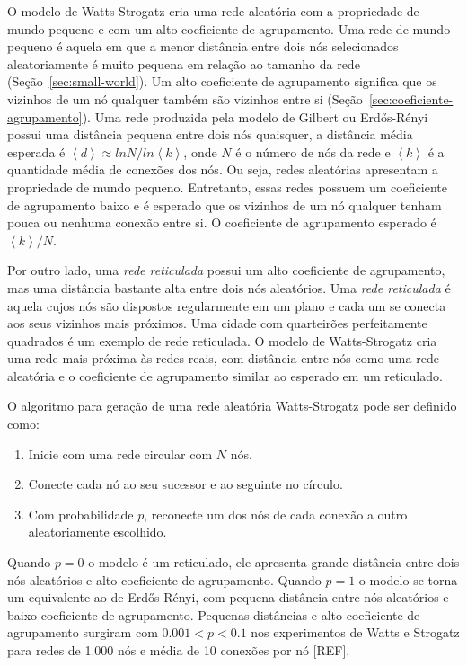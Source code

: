 \documentclass[12pt,a4paper]{article}
\theoremstyle{hypo}
\newcommand{\avg}[1]{\left\langle #1 \right\rangle} %
\begin{document}
O modelo de Watts-Strogatz cria uma rede aleatória com a propriedade de mundo pequeno e com um alto coeficiente de agrupamento. Uma rede de mundo pequeno é aquela em que a menor distância entre dois nós selecionados aleatoriamente é muito pequena em relação ao tamanho da rede (Seção~\ref{sec:small-world}). Um alto coeficiente de agrupamento significa que os vizinhos de um nó qualquer também são vizinhos entre si (Seção~\ref{sec:coeficiente-agrupamento}).
Uma rede produzida pela modelo de Gilbert ou Erdős-Rényi possui uma distância pequena entre dois nós quaisquer, a distância média esperada é $\avg{d} \approx ln N / ln \avg{k}$, onde $N$ é o número de nós da rede e $\avg{k}$ é a quantidade média de conexões dos nós. Ou seja, redes aleatórias apresentam a propriedade de mundo pequeno. Entretanto, essas redes possuem um coeficiente de agrupamento baixo e é esperado que os vizinhos de um nó qualquer tenham pouca ou nenhuma conexão entre si. O coeficiente de agrupamento esperado é $\avg{k}/N$.



Por outro lado, uma \textit{rede reticulada} possui um alto coeficiente de agrupamento, mas uma distância bastante alta entre dois nós aleatórios. Uma \textit{rede reticulada} é aquela cujos nós são dispostos regularmente em um plano e cada um se conecta aos seus vizinhos mais próximos. Uma cidade com quarteirões perfeitamente quadrados é um exemplo de rede reticulada. O modelo de Watts-Strogatz cria uma rede mais próxima às redes reais, com distância entre nós como uma rede aleatória e o coeficiente de agrupamento similar ao esperado em um reticulado.

O algoritmo para geração de uma rede aleatória Watts-Strogatz pode ser definido como:

\begin{enumerate}
\item Inicie com uma rede circular com $N$ nós.

\item Conecte cada nó ao seu sucessor e ao seguinte no círculo.

\item Com probabilidade $p$, reconecte um dos nós de cada conexão a outro aleatoriamente escolhido.
\end{enumerate}

Quando $p = 0$ o modelo é um reticulado, ele apresenta grande distância entre dois nós aleatórios e alto coeficiente de agrupamento. Quando $p = 1$ o modelo se torna um equivalente ao de Erdős-Rényi, com pequena distância entre nós aleatórios e baixo coeficiente de agrupamento. Pequenas distâncias e alto coeficiente de agrupamento surgiram com $0.001 < p < 0.1$ nos experimentos de Watts e Strogatz para redes de 1.000 nós e média de 10 conexões por nó [REF].
\end{document}
